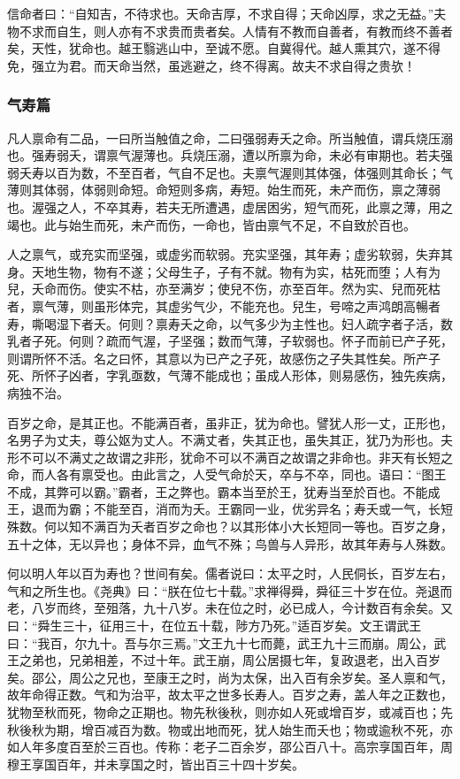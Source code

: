 \documentclass[]{article}
\begin{document}
信命者曰：``自知吉，不待求也。天命吉厚，不求自得；天命凶厚，求之无益。''夫物不求而自生，则人亦有不求贵而贵者矣。人情有不教而自善者，有教而终不善者矣，天性，犹命也。越王翳逃山中，至诚不愿。自冀得代。越人熏其穴，遂不得免，强立为君。而天命当然，虽逃避之，终不得离。故夫不求自得之贵欤！

\hypertarget{header-n44}{%
\subsubsection{气寿篇}\label{header-n44}}

凡人禀命有二品，一曰所当触值之命，二曰强弱寿夭之命。所当触值，谓兵烧压溺也。强寿弱夭，谓禀气渥薄也。兵烧压溺，遭以所禀为命，未必有审期也。若夫强弱夭寿以百为数，不至百者，气自不足也。夫禀气渥则其体强，体强则其命长；气薄则其体弱，体弱则命短。命短则多病，寿短。始生而死，未产而伤，禀之薄弱也。渥强之人，不卒其寿，若夫无所遭遇，虚居困劣，短气而死，此禀之薄，用之竭也。此与始生而死，未产而伤，一命也，皆由禀气不足，不自致於百也。

人之禀气，或充实而坚强，或虚劣而软弱。充实坚强，其年寿；虚劣软弱，失弃其身。天地生物，物有不遂；父母生子，子有不就。物有为实，枯死而堕；人有为兒，夭命而伤。使实不枯，亦至满岁；使兒不伤，亦至百年。然为实、兒而死枯者，禀气薄，则虽形体完，其虚劣气少，不能充也。兒生，号啼之声鸿朗高暢者寿，嘶喝湿下者夭。何则？禀寿夭之命，以气多少为主性也。妇人疏字者子活，数乳者子死。何则？疏而气渥，子坚强；数而气薄，子软弱也。怀子而前已产子死，则谓所怀不活。名之曰怀，其意以为已产之子死，故感伤之子失其性矣。所产子死、所怀子凶者，字乳亟数，气薄不能成也；虽成人形体，则易感伤，独先疾病，病独不治。

百岁之命，是其正也。不能满百者，虽非正，犹为命也。譬犹人形一丈，正形也，名男子为丈夫，尊公妪为丈人。不满丈者，失其正也，虽失其正，犹乃为形也。夫形不可以不满丈之故谓之非形，犹命不可以不满百之故谓之非命也。非天有长短之命，而人各有禀受也。由此言之，人受气命於天，卒与不卒，同也。语曰：``图王不成，其弊可以霸。''霸者，王之弊也。霸本当至於王，犹寿当至於百也。不能成王，退而为霸；不能至百，消而为夭。王霸同一业，优劣异名；寿夭或一气，长短殊数。何以知不满百为夭者百岁之命也？以其形体小大长短同一等也。百岁之身，五十之体，无以异也；身体不异，血气不殊；鸟兽与人异形，故其年寿与人殊数。

何以明人年以百为寿也？世间有矣。儒者说曰：太平之时，人民侗长，百岁左右，气和之所生也。《尧典》曰：``朕在位七十载。''求禅得舜，舜征三十岁在位。尧退而老，八岁而终，至殂落，九十八岁。未在位之时，必已成人，今计数百有余矣。又曰：``舜生三十，征用三十，在位五十载，陟方乃死。''适百岁矣。文王谓武王曰：``我百，尔九十。吾与尔三焉。''文王九十七而薨，武王九十三而崩。周公，武王之弟也，兄弟相差，不过十年。武王崩，周公居摄七年，复政退老，出入百岁矣。邵公，周公之兄也，至康王之时，尚为太保，出入百有余岁矣。圣人禀和气，故年命得正数。气和为治平，故太平之世多长寿人。百岁之寿，盖人年之正数也，犹物至秋而死，物命之正期也。物先秋後秋，则亦如人死或增百岁，或减百也；先秋後秋为期，增百减百为数。物或出地而死，犹人始生而夭也；物或逾秋不死，亦如人年多度百至於三百也。传称：老子二百余岁，邵公百八十。高宗享国百年，周穆王享国百年，并未享国之时，皆出百三十四十岁矣。
\end{document}
